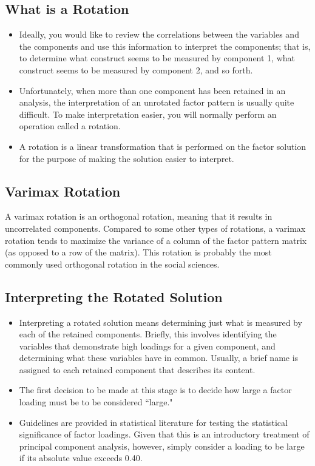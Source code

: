 \documentclass[a4paper,12pt]{article}
\begin{document}
	

\subsection{What is a Rotation}
\begin{itemize}
	\item Ideally, you would like to review the correlations between the variables and the
	components and use this information to interpret the components; that is, to determine what
	construct seems to be measured by component 1, what construct seems to be measured by
	component 2, and so forth. 
	\item Unfortunately, when more than one component has been retained in
	an analysis, the interpretation of an unrotated factor pattern is usually quite difficult. To make
	interpretation easier, you will normally perform an operation called a rotation. 
	\item A rotation is a
	linear transformation that is performed on the factor solution for the purpose of making the
	solution easier to interpret.
\end{itemize}


\subsection{Varimax Rotation}
A varimax rotation is an orthogonal rotation, meaning that
it results in uncorrelated components. Compared to some other types of rotations, a varimax
rotation tends to maximize the variance of a column of the factor pattern matrix (as opposed to a
row of the matrix). This rotation is probably the most commonly used orthogonal rotation in the
social sciences.

\subsection{Interpreting the Rotated Solution}
\begin{itemize}
\item Interpreting a rotated solution means determining just what is measured by each of the retained
components. Briefly, this involves identifying the variables that demonstrate high loadings for a
given component, and determining what these variables have in common. Usually, a brief name
is assigned to each retained component that describes its content.
\item The first decision to be made at this stage is to decide how large a factor loading must be to be
considered ``large."
\item 
Guidelines are provided in statistical literature for testing the statistical significance of factor loadings. Given that this is an introductory treatment of principal component analysis, however, simply consider a loading
to be large if its absolute value exceeds 0.40.
\end{itemize}
\end{document}
